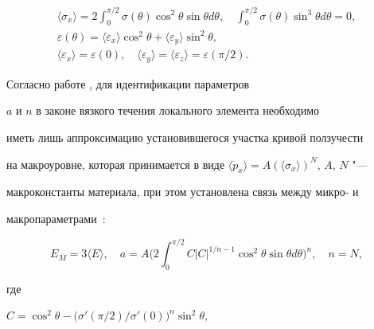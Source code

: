 \begin{gather}

\label{nebogina:eq:5}

\langle\sigma_x\rangle = 2 \int _0^{\pi/2} \sigma(\theta)

\cos^2 \theta \sin \theta d \theta,\quad 

\int _0^{\pi/2} \sigma(\theta) \sin^3 \theta d \theta=0,

\\

\label{nebogina:eq:6} \varepsilon(\theta)=\langle \varepsilon_x

\rangle \cos^2 \theta + \langle \varepsilon_y\rangle \sin^2

\theta,\\

\label{nebogina:eq:7} \langle\varepsilon_x\rangle =

\varepsilon(0), \quad \langle \varepsilon_y \rangle =\langle

\varepsilon_z\rangle = \varepsilon(\pi/2).

\end{gather}



Согласно работе \cite{nebogina:bib5}, для идентификации параметров

$a$ и $n$ в законе вязкого течения локального элемента необходимо

иметь лишь аппроксимацию установившегося участка кривой ползучести

на макроуровне, которая принимается в виде $\langle

\dot{p}_x\rangle= A (\langle \sigma_x\rangle)^N$, $A$, $N$ "---

макроконстанты материала, при этом установлена связь между микро- и

макропараметрами~\cite{nebogina:bib5}:

$$

E_M=3\langle E\rangle, \quad 

a=A\biggl(2 \int _0^{\pi/2} C |C|^{1/n -1} \cos^2 \theta \sin \theta d

\theta\biggr)^{n}, \quad n=N,

$$

где

$

C=\cos ^2 \theta - 

\bigl({\sigma' (\pi/2)}/{\sigma' (0)}

\bigr)^n \sin^2 \theta,

$

